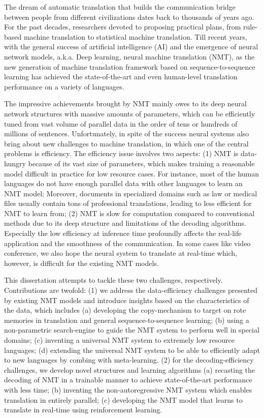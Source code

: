 The dream of automatic translation that builds the communication bridge between people from different civilizations dates back to thousands of years ago. 
For the past decades, researchers devoted to proposing practical plans, from rule-based machine translation to statistical machine translation. 
Till recent years, with the general success of artificial intelligence (AI) and the emergence of neural network models, a.k.a. Deep learning, neural machine translation (NMT), 
as the new generation of machine translation framework based on sequence-to-sequence learning has achieved the state-of-the-art and even human-level translation performance on a variety of languages.

The impressive achievements brought by NMT mainly owes to its deep neural network structures with massive amounts of parameters, 
which can be efficiently tuned from vast volume of parallel data in the order of tens or hundreds of millions of sentences. 
Unfortunately, in spite of the success neural systems also bring about new challenges to machine translation, in which one of the central problems is efficiency. 
The efficiency issue involves two aspects: 
(1) NMT is data-hungry because of its vast size of parameters, which makes training a reasonable model difficult in practice for low resource cases. 
For instance, most of the human languages do not have enough parallel data with other languages to learn an NMT model; 
Moreover, documents in specialized domains such as law or medical files usually contain tons of professional translations, leading to less efficient for NMT to learn from;
(2) NMT is slow for computation compared to conventional methods due to its deep structure and limitations of the decoding algorithms. 
Especially the low efficiency at inference time profoundly affects the real-life application and the smoothness of the communication. 
In some cases like video conference, we also hope the neural system to translate at real-time which, however, is difficult for the existing NMT models. 

This dissertation attempts to tackle these two challenges, respectively.
Contributions are twofold: 
(1) we address the data-efficiency challenges presented by existing NMT models and introduce insights based on the characteristics of the data, which includes 
(a) developing the copy-mechanism to target on rote memories in translation and general sequence-to-sequence learning; 
(b) using a non-parametric search-engine to guide the NMT system to perform well in special domains; 
(c) inventing a universal NMT system to extremely low resource languages; 
(d) extending the universal NMT system to be able to efficiently adapt to new languages by combing with meta-learning.
(2) for the decoding-efficiency challenges, we develop novel structures and learning algorithms 
(a) recasting the decoding of NMT in a trainable manner to achieve state-of-the-art performance with less time; 
(b) inventing the non-autoregressive NMT system which enables translation in entirely parallel; 
(c) developing the NMT model that learns to translate in real-time using reinforcement learning.

